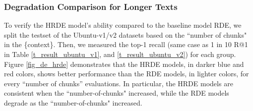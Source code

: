 \documentclass[11pt,a4paper]{article}
\begin{document}
\subsubsection{Degradation Comparison for Longer Texts}
To verify the HRDE model's ability compared to the baseline model RDE, we split the testset of the Ubuntu-v1/v2 datasets based on the ``number of chunks" in the \{context\}. Then, we measured the top-1 recall (same case as 1 in 10 R@1 in Table \ref{t_result_ubuntu_v1}, and \ref{t_result_ubuntu_v2}) for each group. 
Figure \ref{fig_de_hrde} demonstrates that the HRDE models, in darker blue and red colors, shows better performance than the RDE models, in lighter colors, for every ``number of chunks'' evaluations. 
In particular, the HRDE models are consistent when the ``number-of-chunks" increased, while the RDE models degrade as the ``number-of-chunks" increased.
\end{document}
